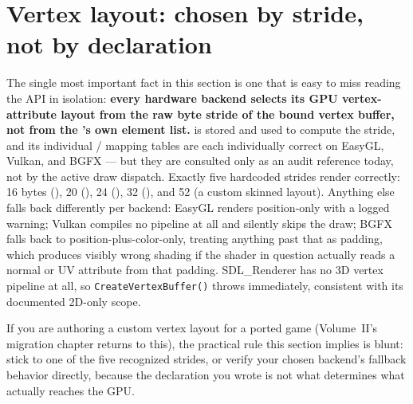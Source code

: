 \section{Vertex layout: chosen by stride, not by declaration}
\label{sec:vertex-layout}

The single most important fact in this section is one that is easy to miss reading the API in
isolation: \textbf{every hardware backend selects its GPU vertex-attribute layout from the raw
byte stride of the bound vertex buffer, not from the 's own
element list.}  is stored and used to compute the stride, and its
individual / mapping tables are
each individually correct on EasyGL, Vulkan, and BGFX --- but they are consulted only as an
audit reference today, not by the active draw dispatch. Exactly five hardcoded strides render
correctly: 16 bytes (), 20 (),
24 (), 32 (), and
52 (a custom skinned layout). Anything else falls back differently per backend: EasyGL
renders position-only with a logged warning; Vulkan compiles no pipeline at all and silently
skips the draw; BGFX falls back to position-plus-color-only, treating anything past that as
padding, which produces visibly wrong shading if the shader in question actually reads a
normal or UV attribute from that padding. SDL\_Renderer has no 3D vertex pipeline at all, so
\texttt{CreateVertexBuffer()} throws immediately, consistent with its documented 2D-only
scope.

If you are authoring a custom vertex layout for a ported game (Volume~II's migration chapter
returns to this), the practical rule this section implies is blunt: stick to one of the five
recognized strides, or verify your chosen backend's fallback behavior directly, because the
declaration you wrote is not what determines what actually reaches the GPU.
